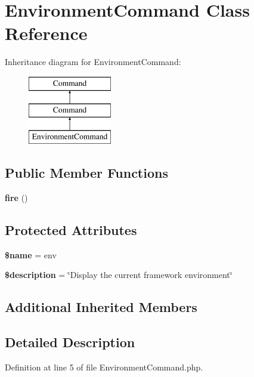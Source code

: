 \section{Environment\+Command Class Reference}
\label{class_illuminate_1_1_foundation_1_1_console_1_1_environment_command}
Inheritance diagram for Environment\+Command\+:\begin{figure}[H]
\begin{center}
\leavevmode
\includegraphics[height=3.000000cm]{class_illuminate_1_1_foundation_1_1_console_1_1_environment_command}
\end{center}
\end{figure}
\subsection*{Public Member Functions}
\begin{DoxyCompactItemize}
\item 
{\bf fire} ()
\end{DoxyCompactItemize}
\subsection*{Protected Attributes}
\begin{DoxyCompactItemize}
\item 
{\bf \$name} = \textquotesingle{}env\textquotesingle{}
\item 
{\bf \$description} = \char`\"{}Display the current framework environment\char`\"{}
\end{DoxyCompactItemize}
\subsection*{Additional Inherited Members}


\subsection{Detailed Description}


Definition at line 5 of file Environment\+Command.\+php.



